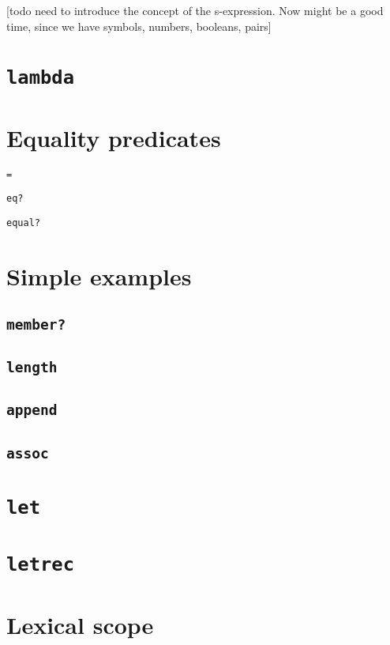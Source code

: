 \documentclass{book}
\begin{document}
[todo need to introduce the concept of the s-expression.  Now might be a good time, since we have symbols, numbers, booleans, pairs]

\section{\texttt{lambda}}


\section{Equality predicates}

\verb|=|

\verb|eq?|

\verb|equal?|

\section{Simple examples}

\subsection{\texttt{member?}}

\subsection{\texttt{length}}

\subsection{\texttt{append}}

\subsection{\texttt{assoc}}

\section{\texttt{let}}

\section{\texttt{letrec}}

\section{Lexical scope}
\end{document}
